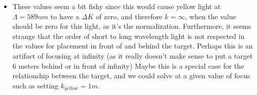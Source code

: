 \documentclass{article}
\begin{document}
\begin{enumerate}[1.]
\begin{item}
\begin{itemize}
\item These values seem a bit fishy since this would cause yellow light at $\Lambda = 589nm$ to have a $\Delta K$ of zero, and therefore $k = \infty$, when the value should be zero for this light, as it's the normalization. Furthermore, it seems strange that the order of short to long wavelength light is not respected in the values for placement in front of and behind the target. Perhaps this is an artifact of focusing at infinity (as it really doesn't make sense to put a target 6 meters behind or in front of infinity) Maybe this is a special case for the relationship between the target, and we could solve at a given value of focus such as setting $k_{yellow} = 1m$.

\end{itemize}

\end{item}
\end{enumerate}
\end{document}
